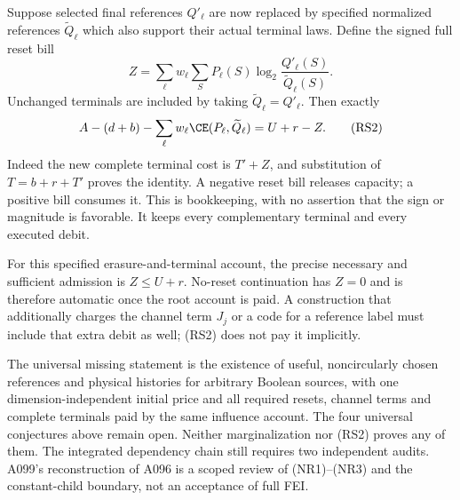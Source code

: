 Suppose selected final references $Q'_\ell$ are now replaced by
specified normalized references $\widetilde Q_\ell$ which also
support their actual terminal laws. Define the signed full reset
bill
\[
 Z=\sum_\ell w_\ell\sum_S P_\ell(S)
                \log_2\frac{Q'_\ell(S)}{\widetilde Q_\ell(S)}.
 \tag{RS1}
\]
Unchanged terminals are included by taking
$\widetilde Q_\ell=Q'_\ell$. Then exactly
\[
 A-(d+b)-\sum_\ell w_\ell\CE(P_\ell,\widetilde Q_\ell)
       =U+r-Z.
 \tag{RS2}
\]
Indeed the new complete terminal cost is $T'+Z$, and substitution
of $T=b+r+T'$ proves the identity. A negative reset bill releases
capacity; a positive bill consumes it. This is bookkeeping, with
no assertion that the sign or magnitude is favorable. It keeps
every complementary terminal and every executed debit.

For this specified erasure-and-terminal account, the precise
necessary and sufficient admission is $Z\le U+r$. No-reset
continuation has $Z=0$ and is therefore automatic once the root
account is paid. A construction that additionally charges the
channel term $J_j$ or a code for a reference label must include
that extra debit as well; (RS2) does not pay it implicitly.

The universal missing statement is the existence of useful,
noncircularly chosen references and physical histories for arbitrary
Boolean sources, with one dimension-independent initial price and
all required resets, channel terms and complete terminals paid by
the same influence account. The four universal conjectures above
remain open. Neither marginalization nor (RS2) proves any of them.
The integrated dependency chain still requires two independent
audits. A099's reconstruction of A096 is a scoped review of (NR1)--(NR3)
and the constant-child boundary, not an acceptance of full FEI.
